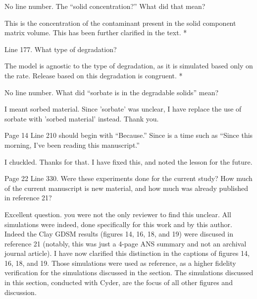 \documentclass[answers,12pt]{exam}
\begin{document}
\begin{questions}
\question No line number. The ``solid concentration?'' What did that mean?
\begin{solution}
This is the concentration of the contaminant present in the solid component 
        matrix volume. This has been further clarified in the text.
        {\color{red}*}
\end{solution}
 

\question Line 177. What type of degradation?
\begin{solution}
The model is agnostic to the type of degradation, as it is simulated based only 
        on the rate.  Release based on this degradation is congruent.
        {\color{red}*}
\end{solution}

 

\question No line number. What did ``sorbate is in the degradable solids'' mean?
\begin{solution}
I meant sorbed material. Since 'sorbate' was unclear, I have replace the use of 
sorbate with 'sorbed material' instead. Thank you.
\end{solution}
 

\question Page 14 Line 210 should begin with ``Because.'' Since is a time such 
as ``Since this morning, I've been reading this manuscript.''
\begin{solution}
I chuckled. Thanks for that. I have fixed this, and noted the lesson for the future. 
\end{solution}

 

\question Page 22 Line 330. Were these experiments done for the current study? How much of the current manuscript is new material, and how much was already published in reference 21?
\begin{solution}
Excellent question. you were not the only reviewer to find this unclear. All 
        simulations were indeed, done specifically for this work and by this 
        author. Indeed the Clay GDSM results (figures 14, 16, 18, and 19) 
        were discused in reference 21 (notably, this was just a 4-page ANS 
        summary and not an archival journal article).
        I have now clarified this distinction in the captions of 
        figures 14, 16, 18, and 19. Those simulations were used as reference, 
        as a higher fidelity verification for the simulations discussed in the 
        section. The simulations discussed in this section, conducted with 
        Cyder, are the focus of all other figures and discussion. 
\end{solution}


\end{questions}
\end{document}
